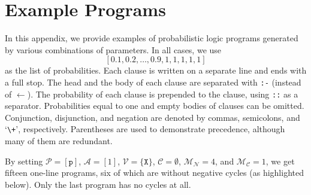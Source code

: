 \documentclass[runningheads]{llncs}
\newcommand{\predicates}{\mathcal{P}}
\newcommand{\variables}{\mathcal{V}}
\newcommand{\constants}{\mathcal{C}}
\newcommand{\arities}{\mathcal{A}}
\newcommand{\maxNumNodes}{\mathcal{M}_{\mathcal{N}}}
\newcommand{\maxNumClauses}{\mathcal{M}_{\mathcal{C}}}
\begin{document}
\section{Example Programs}

In this appendix, we provide examples of probabilistic logic programs generated
by various combinations of parameters. In all cases, we use
\[
  [0.1, 0.2, \dots, 0.9, 1, 1, 1, 1, 1]
\]
as the list of probabilities. Each clause is written on a separate line and ends
with a full stop. The head and the body of each clause are separated with
\texttt{:-} (instead of $\gets$). The probability of each clause is prepended to
the clause, using \texttt{::} as a separator. Probabilities equal to one and
empty bodies of clauses can be omitted. Conjunction, disjunction, and negation
are denoted by commas, semicolons, and `\texttt{\textbackslash+}', respectively.
Parentheses are used to demonstrate precedence, although many of them are
redundant.

By setting $\predicates{} = [\texttt{p}]$, $\arities{} = [1]$, $\variables{} =
\{ \texttt{X} \}$, $\constants{} = \emptyset$, $\maxNumNodes{} = 4$, and
$\maxNumClauses{} = 1$, we get fifteen one-line programs, six of which are
without negative cycles (as highlighted below). Only the last program has no
cycles at all.
\end{document}
